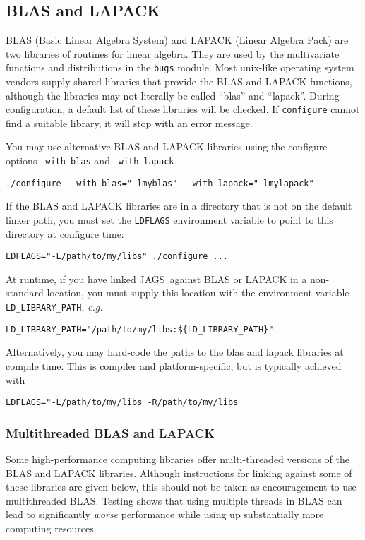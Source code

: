 \documentclass[11pt, a4paper, titlepage]{article}
\newcommand{\JAGS}{\textsf{JAGS}}
\begin{document}
\subsection{BLAS and LAPACK}
\label{section:blas:lapack}

BLAS (Basic Linear Algebra System) and LAPACK (Linear Algebra Pack)
are two libraries of routines for linear algebra. They are used by the
multivariate functions and distributions in the \texttt{bugs} module.
Most unix-like operating system vendors supply shared libraries that
provide the BLAS and LAPACK functions, although the libraries may not
literally be called ``blas'' and ``lapack''.  During configuration, a
default list of these libraries will be checked. If \texttt{configure}
cannot find a suitable library, it will stop with an error message.

You may use alternative BLAS and LAPACK libraries using the configure
options \texttt{--with-blas} and \texttt{--with-lapack}
\begin{verbatim}
./configure --with-blas="-lmyblas" --with-lapack="-lmylapack"
\end{verbatim}

If the BLAS and LAPACK libraries are in a directory that is not on the
default linker path, you must set the \verb+LDFLAGS+ environment variable
to point to this directory at configure time:
\begin{verbatim}
LDFLAGS="-L/path/to/my/libs" ./configure ...
\end{verbatim}

At runtime, if you have linked \JAGS\ against BLAS or LAPACK in
a non-standard location, you must supply this location with the
environment variable \verb+LD_LIBRARY_PATH+, {\em e.g.}
\begin{verbatim}
LD_LIBRARY_PATH="/path/to/my/libs:${LD_LIBRARY_PATH}"
\end{verbatim} %
Alternatively, you may hard-code the paths to the blas and lapack
libraries at compile time. This is compiler and platform-specific,
but is typically achieved with
\begin{verbatim}
LDFLAGS="-L/path/to/my/libs -R/path/to/my/libs
\end{verbatim}

\subsubsection{Multithreaded BLAS and LAPACK}
\label{section:blas:multithreaded}

Some high-performance computing libraries offer multi-threaded
versions of the BLAS and LAPACK libraries. Although instructions for
linking against some of these libraries are given below, this should
not be taken as encouragement to use multithreaded BLAS.  Testing
shows that using multiple threads in BLAS can lead to significantly
{\em worse} performance while using up substantially more computing
resources.
\end{document}
